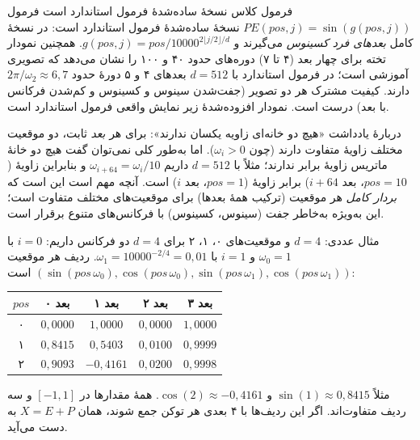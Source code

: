 \begin{correctionbox}{فرمول کلاس نسخهٔ ساده‌شدهٔ فرمول استاندارد است}
فرمول $PE(pos,j)=\sin(g(pos,j))$ نسخهٔ ساده‌شدهٔ فرمول استاندارد است: در نسخهٔ کامل \emph{بعدهای فرد کسینوس} می‌گیرند و $g(pos,j)=pos/10000^{2\lfloor j/2\rfloor/d}$. همچنین نمودار تخته برای چهار بعد (۴ تا ۷) دوره‌های حدود ۴۰ و ۱۰۰ را نشان می‌دهد که تصویری آموزشی است؛ در فرمول استاندارد با $d=512$ بعدهای ۴ و ۵ دورهٔ حدود $2\pi/\omega_2\approx 6{,}7$ دارند. کیفیت مشترک هر دو تصویر (جفت‌شدن سینوس و کسینوس و کم‌شدن فرکانس با بعد) درست است. نمودار افزوده‌شدهٔ زیر نمایش واقعی فرمول استاندارد است.

\medskip
دربارهٔ یادداشت «هیچ دو خانه‌ای زاویه یکسان ندارند»: برای هر \emph{بعد} ثابت، دو موقعیت مختلف زاویهٔ متفاوت دارند (چون $\omega_i>0$). اما به‌طور کلی نمی‌توان گفت هیچ دو خانهٔ ماتریس زاویهٔ برابر ندارند؛ مثلاً با $d=512$ داریم $\omega_{i+64}=\omega_i/10$ و بنابراین زاویهٔ ($pos=10$، بعد $i+64$) برابر زاویهٔ ($pos=1$، بعد $i$) است. آنچه مهم است این است که \emph{بردار کامل} هر موقعیت (ترکیب همهٔ بعدها) برای موقعیت‌های مختلف متفاوت است؛ این به‌ویژه به‌خاطر جفت (سینوس، کسینوس) با فرکانس‌های متنوع برقرار است.
\end{correctionbox}



\begin{addedbox}{مثال عددی: $d=4$ و موقعیت‌های ۰، ۱، ۲}
برای $d=4$ دو فرکانس داریم: $i=0$ با $\omega_0=1$ و $i=1$ با $\omega_1=10000^{-2/4}=0{,}01$. ردیف هر موقعیت $(\sin(pos\,\omega_0),\cos(pos\,\omega_0),\sin(pos\,\omega_1),\cos(pos\,\omega_1))$ است:
\begin{center}
\begin{tabular}{ccccc}
\toprule
$pos$ & بعد ۰ & بعد ۱ & بعد ۲ & بعد ۳ \\
\midrule
۰ & $0{,}0000$ & $1{,}0000$ & $0{,}0000$ & $1{,}0000$ \\
۱ & $0{,}8415$ & $0{,}5403$ & $0{,}0100$ & $0{,}9999$ \\
۲ & $0{,}9093$ & $-0{,}4161$ & $0{,}0200$ & $0{,}9998$ \\
\bottomrule
\end{tabular}
\end{center}
مثلاً $\sin(1)\approx 0{,}8415$ و $\cos(2)\approx -0{,}4161$. همهٔ مقدارها در $[-1,1]$ و سه ردیف متفاوت‌اند. اگر این ردیف‌ها با  ۴ بعدی هر توکن جمع شوند، همان $X=E+P$ به دست می‌آید.
\end{addedbox}

